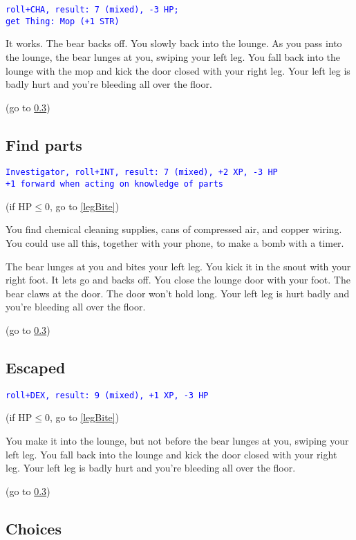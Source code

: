 \documentclass[12pt]{article}
\begin{document}
\textcolor{blue}{\texttt{roll+CHA, result:~7 (mixed), -3 HP;}}\\
\textcolor{blue}{\texttt{get Thing:~Mop (+1 STR)}}

It works. The bear backs off. You slowly back into the lounge. As you pass into the lounge, the bear lunges at you, swiping your left leg. You fall back into the lounge with the mop and kick the door closed with your right leg. Your left leg is badly hurt and you're bleeding all over the floor.

(go to \ref{badLegChoices})

\subsection{Find parts}\label{findParts}

\textcolor{blue}{\texttt{Investigator, roll+INT, result:~7 (mixed), +2 XP, -3 HP}}\\
\textcolor{blue}{\texttt{+1 forward when acting on knowledge of parts}}

(if $\text{HP} \le 0$, go to \ref{legBite})

You find chemical cleaning supplies, cans of compressed air, and copper wiring. You could use all this, together with your phone, to make a bomb with a timer.

The bear lunges at you and bites your left leg. You kick it in the snout
with your right foot. It lets go and backs off. You close the lounge door with your foot. The bear claws at the door. The door won't hold long. Your left leg is hurt badly and you're bleeding all over the floor.

(go to \ref{badLegChoices})

\subsection{Escaped}\label{escaped}

\textcolor{blue}{\texttt{roll+DEX, result:~9 (mixed), +1 XP, -3 HP}}

(if $\text{HP} \le 0$, go to \ref{legBite})

You make it into the lounge, but not before the bear lunges at you, swiping your left leg. You fall back into the lounge and kick the door closed with your right leg. Your left leg is badly hurt and you're bleeding all over the floor.

(go to \ref{badLegChoices})

\subsection{Choices}\label{badLegChoices}
\end{document}
